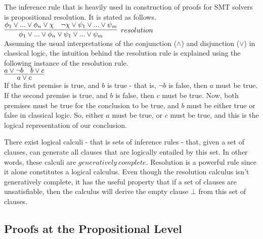 \documentclass{article}
\begin{document}
The inference rule that is heavily used in construction of 
proofs for SMT solvers is propositional resolution. It is
stated as follows. \\
$\infer[resolution]{\phi_1 \lor ... \lor \phi_n \lor \psi_1 \lor ... \lor \psi_m}
{\phi_1 \lor ... \lor \phi_n \lor \chi & \neg \chi \lor \psi_1 \lor ... \lor \psi_m}$ \\

Assuming the usual interpretations of the conjunction
($\land$) and disjunction ($\lor$) in classical logic, the 
intuition behind the resolution rule is explained using the 
following instance of the resolution rule. \\
$\infer{a \lor c}{a \lor \neg b & b \lor c}$ \\
If the first premise is true, and $b$ is true - that is, 
$\neg b$ is false, then $a$ must be true. If the second 
premise is true, and $b$ is false, then $c$ must be true.
Now, both premises must be true for the conclusion to be true, 
and $b$ must be either true or false in classical logic. 
So, either $a$ must be true, or $c$ must be true, and this 
is the logical representation of our conclusion.

There exist logical calculi - that is sets of inference 
rules - that, given a set of clauses, can generate all 
clauses that are logically entailed by this set. In other 
words, these calculi are $generatively\ complete$. Resolution 
is a powerful rule since it alone constitutes a logical 
calculus. Even though the resolution calculus 
isn't generatively complete, it has the useful property that 
if a set of clauses are unsatisfiable, then the calculus will 
derive the empty clause $\bot$ from this set of clauses. 


\subsection{Proofs at the Propositional Level}
\label{sec:propproofs}
\end{document}
